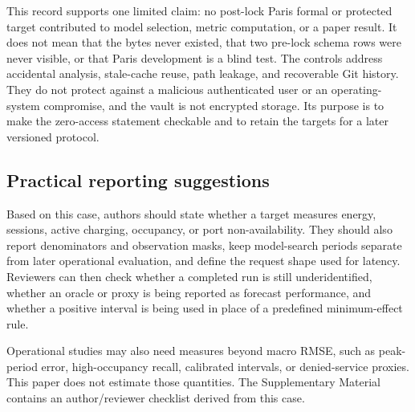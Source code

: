 This record supports one limited claim: no post-lock Paris formal or protected target contributed to model selection, metric computation, or a paper result.  It does not mean that the bytes never existed, that two pre-lock schema rows were never visible, or that Paris development is a blind test.  The controls address accidental analysis, stale-cache reuse, path leakage, and recoverable Git history.  They do not protect against a malicious authenticated user or an operating-system compromise, and the vault is not encrypted storage.  Its purpose is to make the zero-access statement checkable and to retain the targets for a later versioned protocol.

\subsection{Practical reporting suggestions}

Based on this case, authors should state whether a target measures energy, sessions, active charging, occupancy, or port non-availability.  They should also report denominators and observation masks, keep model-search periods separate from later operational evaluation, and define the request shape used for latency.  Reviewers can then check whether a completed run is still underidentified, whether an oracle or proxy is being reported as forecast performance, and whether a positive interval is being used in place of a predefined minimum-effect rule.

Operational studies may also need measures beyond macro RMSE, such as peak-period error, high-occupancy recall, calibrated intervals, or denied-service proxies.  This paper does not estimate those quantities.  The Supplementary Material contains an author/reviewer checklist derived from this case.
